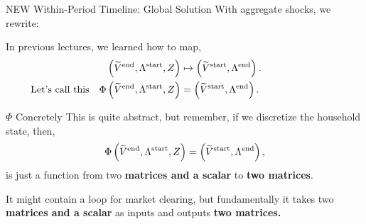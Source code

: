 \documentclass[10pt,aspectratio=169]{beamer}
\begin{document}
\begin{frame}{NEW Within-Period Timeline: Global Solution}
  With aggregate shocks, we rewrite:

  \vspace{0.4em}
  {\centering
  }

  \vspace{1em}
  In previous lectures, we learned how to map,
  \begin{align*}
    \left( \widetilde{V}^{\mathrm{end}}, \Lambda^{\mathrm{start}}, Z \right) &\mapsto \left( \widetilde{V}^{\mathrm{start}}, \Lambda^{\mathrm{end}} \right).\\
    \text{Let's call this}\quad   \Phi\left( \widetilde{V}^{\mathrm{end}}, \Lambda^{\mathrm{start}}, Z \right) &= \left( \widetilde{V}^{\mathrm{start}}, \Lambda^{\mathrm{end}} \right).\hspace{8em}
  \end{align*}
\end{frame}

\begin{frame}{$\Phi$ Concretely}
  This is quite abstract, but remember, if we discretize the household state, then,
  \[
    \Phi\left( \widetilde{V}^{\mathrm{end}}, \Lambda^{\mathrm{start}}, Z \right) = \left( \widetilde{V}^{\mathrm{start}}, \Lambda^{\mathrm{end}} \right),
  \]
  is just a function from two \textbf{matrices and a scalar} to \textbf{two matrices}.

  It might contain a loop for market clearing, but fundamentally it takes two \textbf{matrices and a scalar} as inputs and outputs \textbf{two matrices.}
\end{frame}
\end{document}
